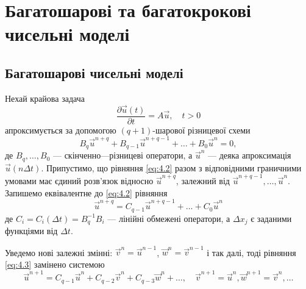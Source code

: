 \section{Багатошарові та багатокрокові чисельні моделі}


\subsection{Багатошарові чисельні моделі}

Нехай крайова задача
\begin{equation}
    \label{eq:4.1}
    \frac{\partial \vec u(t)}{\partial t} = A \vec u, \quad t > 0
\end{equation}
апроксимується за допомогою $(q+1)$-шарової різницевої схеми
\begin{equation}
    \label{eq:4.2}
    B_q \vec u^{n + q} + B_{q - 1} \vec u^{n + q - 1} + \ldots + B_0 \vec u^n = 0,
\end{equation}
де $B_q, \ldots, B_0$ --- скінченно---різницеві оператори, а $\vec u^n$ --- деяка апроксимація $\vec u(n \Delta t)$. Припустимо, що рівняння \eqref{eq:4.2} разом з відповідними граничними умовами має єдиний розв'язок відносно $\vec u^{n + q}$, залежний від $\vec u^{n + q - 1}, \ldots, \vec u^n$. Запишемо еквівалентне до \eqref{eq:4.2} рівняння 
\begin{equation}
    \label{eq:4.3}
    \vec u^{n + q} = C_{q - 1} \vec u^{n + q - 1} + \ldots + C_0 \vec u^n
\end{equation}
де $C_i = C_i(\Delta t) = B_q^{-1} B_i$ --- лінійні обмежені оператори, а $\Delta x_j$ є заданими функціями від $\Delta t$. \medskip

Уведемо нові залежні змінні: $\vec v^n = \vec u^{n - 1}$, $\vec w^n = \vec v^{n - 1}$ і так далі, тоді рівняння \eqref{eq:4.3} замінено системою 
\begin{equation}
    \label{eq:4.4}
    \vec u^{n + 1} = C_{q - 1} \vec u^n + C_{q - 2} \vec v^n + C_{q - 3} \vec w^n + \ldots, \quad \vec v^{n + 1} = \vec u^n, \vec w^{n + 1} = \vec v^n, \ldots
\end{equation}


